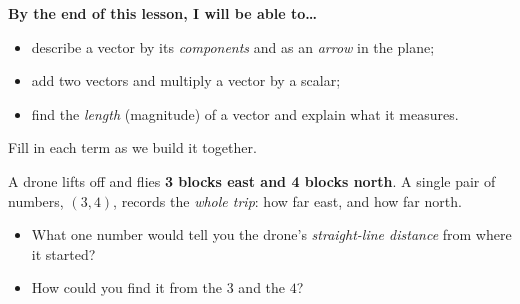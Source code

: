 \documentclass[10pt]{article}
\begin{document}

\vspace{0.12in}

\begin{objectivebox}
\textbf{By the end of this lesson, I will be able to\dots}
\begin{itemize}\setlength{\itemsep}{2pt}
  \item describe a vector by its \emph{components} and as an \emph{arrow} in the plane;
  \item add two vectors and multiply a vector by a scalar;
  \item find the \emph{length} (magnitude) of a vector and explain what it measures.
\end{itemize}
\end{objectivebox}

\vspace{0.10in}

\begin{vocabbox}
\small
Fill in each term as we build it together.
\par\vspace{2pt}
\end{vocabbox}

\begin{hookbox}
A drone lifts off and flies \textbf{3 blocks east and 4 blocks north}. A single pair
of numbers, $(3,4)$, records the \emph{whole trip}: how far east, and how far north.
\begin{itemize}\setlength{\itemsep}{1pt}
  \item What one number would tell you the drone's \emph{straight-line distance} from
        where it started? \blank{3.2cm}
  \item How could you find it from the $3$ and the $4$? \writeline
\end{itemize}
\end{hookbox}
\end{document}

